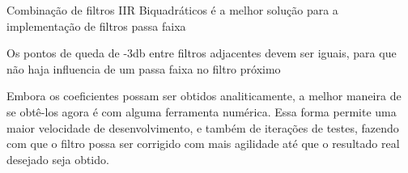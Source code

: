 \color{orange}
Combinação de filtros IIR Biquadráticos é a melhor solução para a implementação de filtros passa faixa

Os pontos de queda de -3db entre filtros adjacentes devem ser iguais, para que não haja influencia de um passa faixa no filtro próximo

Embora os coeficientes possam ser obtidos analiticamente, a melhor maneira de se obtê-los agora é com alguma ferramenta numérica. Essa forma permite uma maior velocidade de desenvolvimento, e também de iterações de testes, fazendo com que o filtro possa ser corrigido com mais agilidade até que o resultado real desejado seja obtido.
\color{black}

    
    
    
    
    

